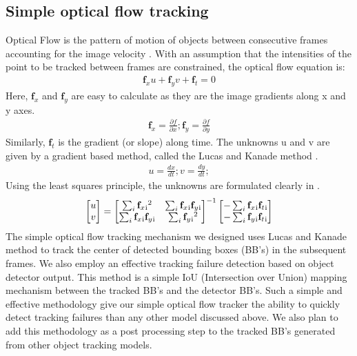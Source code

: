 \documentclass[conference]{IEEEtran}
\begin{document}
\subsection{Simple optical flow tracking}\label{sec.optflow}
Optical Flow is the pattern of motion of objects between consecutive frames accounting for the image velocity \cite{perf_optical_flow}. 
With an assumption that the intensities of the point to be tracked between frames are constrained, the optical flow equation is:
\begin{align}
\mathbf{f}_x{u} + \mathbf{f}_y{v} + \mathbf{f}_t = 0
\end{align}
Here, $\mathbf{f}_x$ and $\mathbf{f}_y$ are easy to calculate as they are the image gradients along x and y axes. 
\begin{align}
\mathbf{f}_x = \frac{\partial f}{\partial x}; 
\mathbf{f}_y = \frac{\partial f}{\partial y} 
\end{align}
Similarly, $\mathbf{f}_t$ is the gradient (or slope) along time.
The unknowns {u} and {v} are given by a gradient based method, called the Lucas and Kanade method \cite{LK_img_registration}.
\begin{align}
{u} = \frac{dx}{dt}; 
{v} = \frac{dy}{dt}; 
\end{align}
Using the least squares principle, the unknowns are formulated clearly in \cite{opt_flow_measurement_motion_using_LK}.
\[
\begin{bmatrix}
{u} \\
{v}
\end{bmatrix}
=
\begin{bmatrix}
\sum_i \mathbf{f}_x\textsubscript{i}^2 & \sum_i \mathbf{f}_x\textsubscript{i}\mathbf{f}_y\textsubscript{i} \\
\sum_i \mathbf{f}_x\textsubscript{i}\mathbf{f}_y\textsubscript{i} & \sum_i \mathbf{f}_y\textsubscript{i}^2
\end{bmatrix}^{-1}
\begin{bmatrix}
-\sum_i \mathbf{f}_x\textsubscript{i}\mathbf{f}_t\textsubscript{i} \\
-\sum_i \mathbf{f}_y\textsubscript{i}\mathbf{f}_t\textsubscript{i}
\end{bmatrix}
\]
The simple optical flow tracking mechanism we designed uses Lucas and Kanade method \cite{opt_flow_measurement_motion_using_LK} to track the center of detected bounding boxes ({BB}'s) in the subsequent frames.
We also employ an effective tracking failure detection based on object detector output. 
This method is a simple IoU (Intersection over Union) \cite[p.~314]{VOC_challenge} mapping mechanism between the tracked BB's and the detector BB's.
Such a simple and effective methodology give our simple optical flow tracker the ability to quickly detect tracking failures than any other model discussed above.
We also plan to add this methodology as a post processing step to the tracked BB's generated from other object tracking models.
\end{document}
